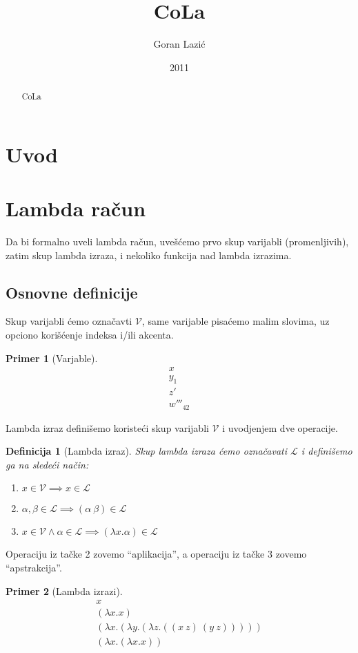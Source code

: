 \documentclass[10pt,a4paper,oneside]{article}
\newtheorem*{definition}{Definicija}
\newtheorem*{primer}{Primer}
\begin{document}
  \title{CoLa}
  \author{Goran Lazi\'{c}}
  \date{2011}
  \maketitle
  \begin{abstract}
    CoLa
  \end{abstract}
  \section{Uvod}
  \section{Lambda ra\v{c}un}
    Da bi formalno uveli lambda ra\v{c}un, uve\v{s}\'{c}emo prvo skup varijabli (promenljivih), zatim skup lambda izraza, i nekoliko funkcija nad lambda izrazima.
    \subsection{Osnovne definicije}
    Skup varijabli \'{c}emo ozna\v{c}avti \(\mathcal{V}\), same varijable pisa\'{c}emo malim slovima, uz opciono kori\v{s}\'{c}enje indeksa i/ili akcenta.
    \begin{primer}[Varjable]
      \begin{gather*}
        x\\
        y_{1}\\
        z'\\
        w'''_{42}
      \end{gather*}
    \end{primer}

    Lambda izraz defini\v{s}emo koriste\'{c}i skup varijabli \(\mathcal{V}\) i uvodjenjem dve operacije.
    \begin{definition}[Lambda izraz]
      Skup lambda izraza \'{c}emo ozna\v{c}avati \(\mathcal{L}\) i defini\v{s}emo ga na slede\'{c}i na\v{c}in:
      \begin{enumerate}
        \item
          \(x
            \in \mathcal{V} \implies
            x \in \mathcal{L}
          \)
        \item
          \(
            \alpha, \beta \in \mathcal{L} \implies
            (\alpha\ \beta) \in \mathcal{L}
          \)
        \item
          \(
            x \in \mathcal{V} \land
            \alpha \in \mathcal{L} \implies
            (\lambda x.\alpha) \in \mathcal{L}
          \)
      \end{enumerate}
    \end{definition}
    Operaciju iz ta\v{c}ke 2 zovemo ``aplikacija'', a operaciju iz ta\v{c}ke 3 zovemo ``apstrakcija''.
    \begin{primer}[Lambda izrazi]
      \begin{gather*}
        x\\
        (\lambda x.x)\\
        (\lambda x.(\lambda y.(\lambda z.((x\ z)\ (y\ z)))))\\
        (\lambda x.(\lambda x.x))
      \end{gather*}
    \end{primer}
\end{document}
